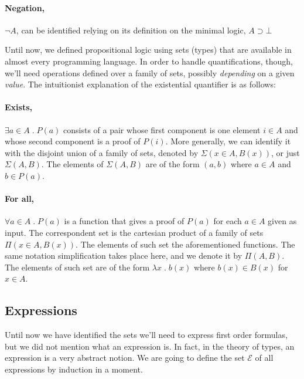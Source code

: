 \paragraph{Negation,} $\neg A$, can be identified relying on its definition
on the minimal logic, $A \supset \bot$

Until now, we defined propositional logic using sets (types) that are available in almost every
programming language. In order to handle quantifications, though, we'll need operations defined over a 
family of sets, possibly \emph{depending} on a given \emph{value}. The intuitionist explanation
of the existential quantifier is as follows:

\paragraph{Exists,} $\exists a \in A \; . \; P(a)$ consists of a pair whose first
component is one element $i \in A$ and whose second component is a proof of $P(i)$. More generally,
we can identify it with the disjoint union of a family of sets, denoted by $\Sigma(x \in A, B(x))$,
or just $\Sigma(A, B)$. The elements of $\Sigma(A, B)$ are of the form $(a, b)$ where $a \in A$ and
$b \in P(a)$.

\paragraph{For all,} $\forall a \in A \; . \; P(a)$ is a function that gives a proof of $P(a)$
for each $a \in A$ given as input. The correspondent set is the cartesian product of a family
of sets $\Pi(x \in A, B(x))$. The elements of such set the aforementioned functions. The same
notation simplification takes place here, and we denote it by $\Pi(A, B)$. The elements of such set
are of the form $\lambda x\;.\;b(x)$ where $b(x) \in B(x)$ for $x \in A$. 

\subsection{Expressions}

Until now we have identified the sets we'll need to express first order formulas, but we
did not mention what an expression is. In fact, in the theory of types, an expression is a
very abstract notion. We are going to define the set $\mathcal{E}$ of all expressions by induction
in a moment. 

